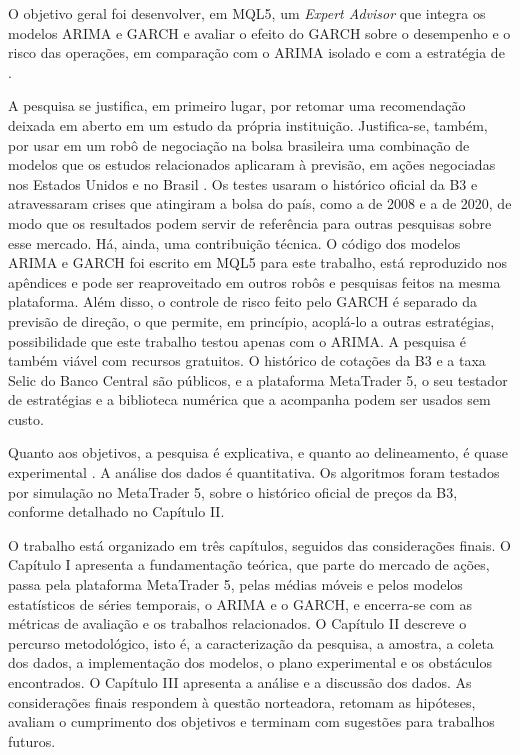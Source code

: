 O objetivo geral foi desenvolver, em MQL5, um \textit{Expert Advisor} que
integra os modelos ARIMA e GARCH e avaliar o efeito do GARCH sobre o desempenho e
o risco das operações, em comparação com o ARIMA isolado e com a estratégia de
.

A pesquisa se justifica, em primeiro lugar, por retomar uma recomendação deixada
em aberto em um estudo da própria instituição. Justifica-se, também, por usar
em um robô de negociação na bolsa brasileira uma combinação de modelos que os
estudos relacionados aplicaram à previsão, em ações negociadas nos Estados Unidos
\cite{xing2024,araya2024} e no Brasil \cite{thomaz2019}. Os testes usaram
o histórico oficial da B3 e atravessaram crises que atingiram a bolsa do país,
como a de 2008 e a de 2020, de modo que os resultados podem servir de referência
para outras pesquisas sobre esse mercado. Há, ainda, uma contribuição técnica.
O código dos modelos ARIMA e GARCH foi escrito em MQL5 para este trabalho, está
reproduzido nos apêndices e pode ser reaproveitado em outros robôs e pesquisas
feitos na mesma plataforma. Além
disso, o controle de risco feito pelo GARCH é separado da previsão de direção, o
que permite, em princípio, acoplá-lo a outras estratégias, possibilidade que
este trabalho testou apenas com o ARIMA. A pesquisa é também viável com
recursos gratuitos. O histórico de cotações da B3 e a taxa Selic do Banco Central
são públicos, e a plataforma MetaTrader 5, o seu testador de estratégias e a
biblioteca numérica que a acompanha podem ser usados sem custo.

Quanto aos objetivos, a pesquisa é explicativa, e quanto ao delineamento, é
quase experimental \cite{wazlawick2021}. A análise dos dados é quantitativa. Os
algoritmos foram testados por simulação no MetaTrader 5, sobre o histórico
oficial de preços da B3, conforme detalhado no Capítulo II.

O trabalho está organizado em três capítulos, seguidos das considerações finais.
O Capítulo I apresenta a fundamentação teórica, que parte do mercado de ações, passa pela
plataforma MetaTrader 5, pelas médias móveis e pelos modelos estatísticos de séries
temporais, o ARIMA e o GARCH, e encerra-se com as métricas de avaliação e os trabalhos
relacionados. O
Capítulo II descreve o percurso metodológico, isto é, a caracterização da
pesquisa, a amostra, a coleta dos dados, a implementação dos
modelos, o plano experimental e os obstáculos encontrados. O Capítulo III apresenta a análise e a
discussão dos dados. As considerações finais respondem à questão norteadora,
retomam as hipóteses, avaliam o cumprimento dos objetivos e terminam com
sugestões para trabalhos futuros.
